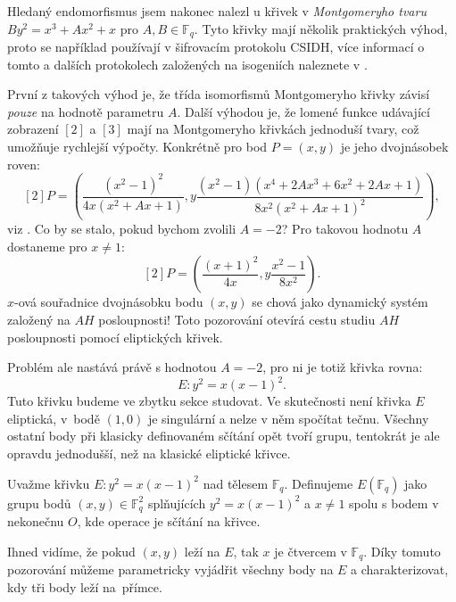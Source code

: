 \documentclass[12pt]{report}
\begin{document}
Hledaný endomorfismus jsem nakonec nalezl u křivek v \textit{Montgomeryho tvaru} $ B y^2 = x^3 + A x^2 +x$ pro $A,B \in \mathbb{F}_q$. Tyto křivky mají několik praktických výhod, proto se například používají v šifrovacím protokolu CSIDH, více informací o tomto a dalších protokolech založených na isogeniích naleznete v \cite{Pezlar}.

První z takových výhod je, že třída isomorfismů Montgomeryho křivky závisí \textit{pouze} na hodnotě parametru $A$. Další výhodou je, že lomené funkce udávající zobrazení $[2]$ a $[3]$ mají na Montgomeryho křivkách jednoduší tvary, což umožňuje rychlejší výpočty. Konkrétně pro bod $P = (x,y)$ je jeho dvojnásobek roven:
$$[2] P = \left(\frac{(x^2-1)^2}{4x(x^2+Ax+1)},y \frac{(x^2-1)(x^4+2 A x^3 + 6x^2 + 2 Ax + 1)}{8 x^2 (x^2+Ax+1)^2} \right),$$
viz \cite{Karaskova}. Co by se stalo, pokud bychom zvolili $A = -2$? Pro takovou hodnotu $A$ dostaneme pro $x \neq 1$:
\begin{equation}\label{dvoj}
[2] P = \left(\frac{(x+1)^2}{4x},y \frac{x^2-1}{8 x^2} \right).
\end{equation}
$x$-ová souřadnice dvojnásobku bodu $(x,y)$ se chová jako dynamický systém založený na $AH$ posloupnosti! Toto pozorování otevírá cestu studiu $AH$ posloupnosti pomocí eliptických křivek.

Problém ale nastává právě s hodnotou $A=-2$, pro ni je totiž křivka rovna: $$E: y^2 = x(x-1)^2.$$ Tuto křivku budeme ve zbytku sekce studovat. Ve skutečnosti není křivka $E$ eliptická, v~bodě $(1,0)$ je singulární a nelze v něm spočítat tečnu. Všechny ostatní body při klasicky definovaném sčítání opět tvoří grupu, tentokrát je ale opravdu jednodušší, než na klasické eliptické křivce. 

\begin{definice}
Uvažme křivku $E : y^2 = x(x-1)^2$ nad tělesem $\mathbb{F}_q$. Definujeme $E(\mathbb{F}_q)$ jako grupu bodů $(x,y) \in \mathbb{F}_q ^2$ splňujících $y^2 = x(x-1)^2$ a $x \neq 1$ spolu s bodem v nekonečnu $O$, kde operace je sčítání na křivce.  
\end{definice}

Ihned vidíme, že pokud $(x,y)$ leží na $E$, tak $x$ je čtvercem v $\mathbb{F}_q$. Díky tomuto pozorování můžeme parametricky vyjádřit všechny body na $E$ a charakterizovat, kdy tři body leží na~přímce.
\end{document}
